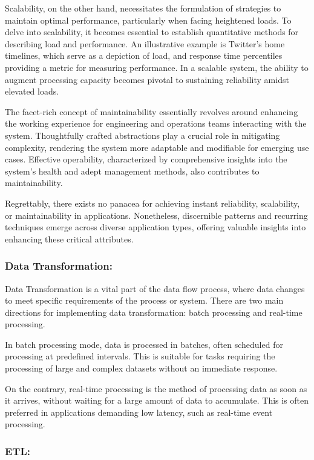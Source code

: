 Scalability, on the other hand, necessitates the formulation of strategies to
maintain optimal performance, particularly when facing heightened loads. To
delve into scalability, it becomes essential to establish quantitative methods
for describing load and performance. An illustrative example is Twitter's home
timelines, which serve as a depiction of load, and response time percentiles
providing a metric for measuring performance. In a scalable system, the ability
to augment processing capacity becomes pivotal to sustaining reliability amidst
elevated loads.

The facet-rich concept of maintainability essentially revolves around enhancing
the working experience for engineering and operations teams interacting with the
system. Thoughtfully crafted abstractions play a crucial role in mitigating
complexity, rendering the system more adaptable and modifiable for emerging use
cases. Effective operability, characterized by comprehensive insights into the
system's health and adept management methods, also contributes to
maintainability.

Regrettably, there exists no panacea for achieving instant reliability,
scalability, or maintainability in applications. Nonetheless, discernible
patterns and recurring techniques emerge across diverse application types,
offering valuable insights into enhancing these critical attributes.

\subsubsection*{Data Transformation:}

Data Transformation is a vital part of the data flow process, where data changes
to meet specific requirements of the process or system. There are two main
directions for implementing data transformation: batch processing and real-time
processing.

In batch processing mode, data is processed in batches, often scheduled for
processing at predefined intervals. This is suitable for tasks requiring the
processing of large and complex datasets without an immediate response.

On the contrary, real-time processing is the method of processing data as soon
as it arrives, without waiting for a large amount of data to accumulate. This is
often preferred in applications demanding low latency, such as real-time event
processing.

\subsubsection*{ETL:}

